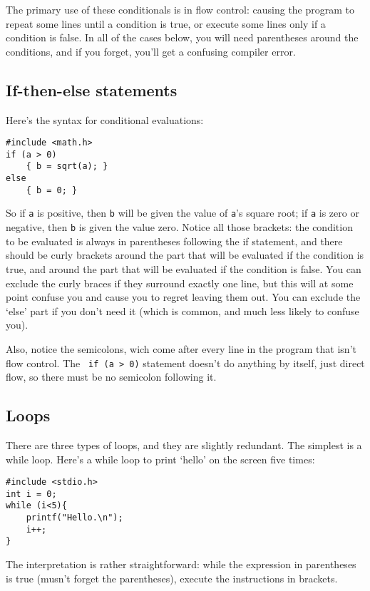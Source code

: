 \documentclass[12pt]{article}
\makeatletter
\def\ttindex#1{\index{#1@{\tt #1}}}
\makeatother
\begin{document}
The primary use of these conditionals is in flow control: causing
the program to repeat some lines until a condition is true, or execute some lines only if a condition is
false.  In all of the cases below, you will need parentheses around the conditions, and if you forget,
you'll get a confusing compiler error.

\subsection{If-then-else statements} Here's the syntax for conditional evaluations: \ttindex{if}

\begin{verbatim}
#include <math.h>
if (a > 0)
    { b = sqrt(a); }
else 
    { b = 0; }
\end{verbatim}
So if {\tt a} is positive, then {\tt b} will be given the value of {\tt a}'s square root; if {\tt a} is
zero or negative, then {\tt b} is given the value zero. Notice all those brackets: the condition to be
evaluated is always in parentheses following the if statement, and there should be curly brackets around
the part that will be evaluated if the condition is true, and around the part that will be evaluated if
the condition is false. You can exclude the curly braces if they surround exactly one line, but this
will at some point confuse you and cause you to regret leaving them out.
You can exclude the `else' part if you don't need it (which is common, and much less likely to confuse you).

Also, notice the semicolons, wich come after every line in the program that isn't flow control. The {\tt
if (a > 0)} statement doesn't do anything by itself, just direct flow, so there must be no semicolon following
it.

\subsection{Loops} There are three types of loops, and they are slightly redundant. The simplest is a while
loop. Here's a while loop to print `hello' on the screen five times:  \ttindex{while}

\begin{verbatim}
#include <stdio.h>
int i = 0;
while (i<5){
    printf("Hello.\n");
    i++;
}
\end{verbatim}

The interpretation is rather straightforward: while the expression in parentheses is true (musn't forget
the parentheses), execute the instructions in brackets.
\end{document}
